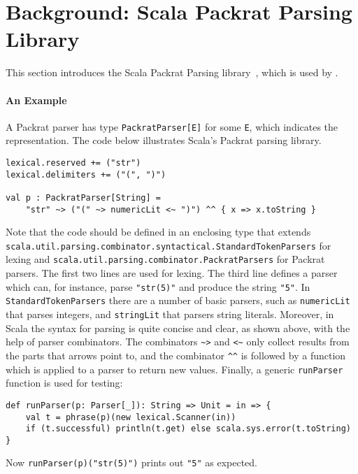 \section{Background: Scala Packrat Parsing Library}\label{sec:packratparsers}


This section introduces the Scala Packrat Parsing library~\cite{}, which is
used by \name.

\paragraph{An Example}
A Packrat parser has type \lstinline{PackratParser[E]} for some
\lstinline{E}, which indicates the representation. The code below illustrates
Scala's Packrat parsing library. 

\begin{lstlisting}
lexical.reserved += ("str")
lexical.delimiters += ("(", ")")

val p : PackratParser[String] =
    "str" ~> ("(" ~> numericLit <~ ")") ^^ { x => x.toString }
\end{lstlisting}

\noindent
 
Note that the code should be defined in an enclosing type that extends
\lstinline{scala.util.parsing.combinator.syntactical.StandardTokenParsers}
for lexing and
\lstinline{scala.util.parsing.combinator.PackratParsers} for Packrat
parsers.
The first two lines are used for lexing. The third line defines a
parser which can, for instance, parse \lstinline{"str(5)"} and produce
the string \lstinline{"5"}. In \lstinline{StandardTokenParsers} there
are a number of basic parsers, such as \lstinline{numericLit} that
parses integers, and \lstinline{stringLit} that parsers string
literals. Moreover, in Scala the syntax for parsing
is quite concise and clear, as shown above, with the help of
parser combinators. The combinators \lstinline{~>} and \lstinline{<~} only collect
results from the parts that arrows point to, and the combinator \lstinline{^^} is
followed by a function which is applied to a parser to return new
values. Finally, a generic \lstinline{runParser}
function is used for testing:

\begin{lstlisting}
def runParser(p: Parser[_]): String => Unit = in => {
    val t = phrase(p)(new lexical.Scanner(in))
    if (t.successful) println(t.get) else scala.sys.error(t.toString)
}
\end{lstlisting}
Now \lstinline{runParser(p)("str(5)")} prints out \lstinline{"5"} as expected.

